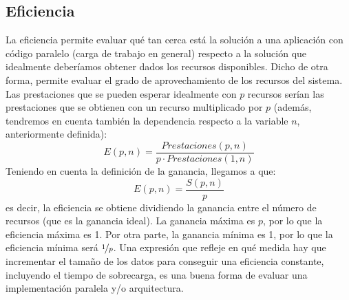 \subsection{Eficiencia}
La eficiencia permite evaluar qué tan cerca está la solución a una aplicación con código paralelo (carga de trabajo en general) respecto a la solución que idealmente deberíamos obtener dados los recursos disponibles. Dicho de otra forma, permite evaluar el grado de aprovechamiento de los recursos del sistema. Las prestaciones que se pueden esperar idealmente con $p$ recursos serían las prestaciones que se obtienen con un recurso multiplicado por $p$ (además, tendremos en cuenta también la dependencia respecto a la variable $n$, anteriormente definida):
\begin{equation*}
    E(p,n) = \dfrac{Prestaciones(p,n)}{p\cdot Prestaciones(1,n)}
\end{equation*}
Teniendo en cuenta la definición de la ganancia, llegamos a que:
\begin{equation}
    E(p,n) = \dfrac{S(p,n)}{p}
\end{equation}
es decir, la eficiencia se obtiene dividiendo la ganancia entre el número de recursos (que es la ganancia ideal). La ganancia máxima es $p$, por lo que la eficiencia máxima es 1. Por otra parte, la ganancia mínima es 1, por lo que la eficiencia mínima será $\nicefrac{1}{p}$. Una expresión que refleje en qué medida hay que incrementar el tamaño de los datos para conseguir una eficiencia constante, incluyendo el tiempo de sobrecarga, es una buena forma de evaluar una implementación paralela y/o arquitectura. 


